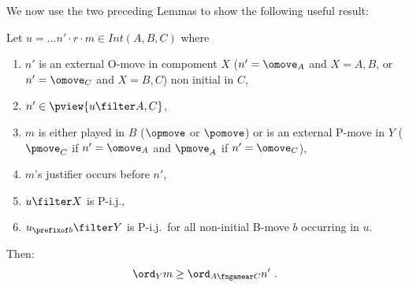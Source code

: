 We now use the two preceding Lemmas to show
the following useful result:
\begin{lemma}
\label{lem:increasing_order}
Let $u = \ldots n' \cdot r \cdot m \in Int(A,B,C)$ where
\begin{enumerate}
\item
$n'$ is an external O-move in compoment $X$
($n'=\omove_A$ and $X=A,B$, or $n'=\omove_C$ and $X=B,C$)  non initial in $C$,
\item $n' \in \pview{u\filter A,C}$,
\item $m$ is either played in $B$
($\opmove$ or $\pomove$) or is an external
 P-move in $Y$
($\pmove_C$ if $n'=\omove_A$ and
$\pmove_A$ if $n'=\omove_C$),
\item $m$'s justifier occurs before $n'$,
\item $u\filter X$ is P-i.j.,
\item $u_{\prefixof b}\filter Y$ is P-i.j.\ for all non-initial B-move $b$ occurring in $u$.
\end{enumerate}
Then:
$$ \ord_{Y} m \geq \ord_{A\fngamear C} n' \ .$$
\end{lemma}
